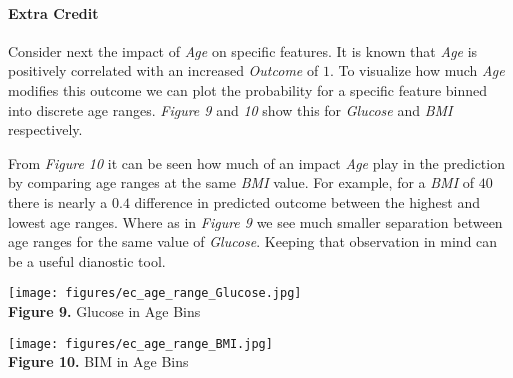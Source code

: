 \documentclass[11pt]{article}
\begin{document}
    \hypertarget{extra-credit}{%
\paragraph{Extra Credit}\label{extra-credit}}

Consider next the impact of \emph{Age} on specific features. It is known
that \emph{Age} is positively correlated with an increased
\emph{Outcome} of \(1\). To visualize how much \emph{Age} modifies this
outcome we can plot the probability for a specific feature binned into
discrete age ranges. \emph{Figure 9} and \emph{10} show this for
\emph{Glucose} and \emph{BMI} respectively.

From \emph{Figure 10} it can be seen how much of an impact \emph{Age}
play in the prediction by comparing age ranges at the same \emph{BMI}
value. For example, for a \emph{BMI} of \(40\) there is nearly a \(0.4\)
difference in predicted outcome between the highest and lowest age
ranges. Where as in \emph{Figure 9} we see much smaller separation
between age ranges for the same value of \emph{Glucose}. Keeping that
observation in mind can be a useful dianostic tool.

\texttt{[image: figures/ec\_age\_range\_Glucose.jpg]}\\
\textbf{Figure 9.} Glucose in Age Bins

\texttt{[image: figures/ec\_age\_range\_BMI.jpg]}\\
\textbf{Figure 10.} BIM in Age Bins


    
    
    
\end{document}
